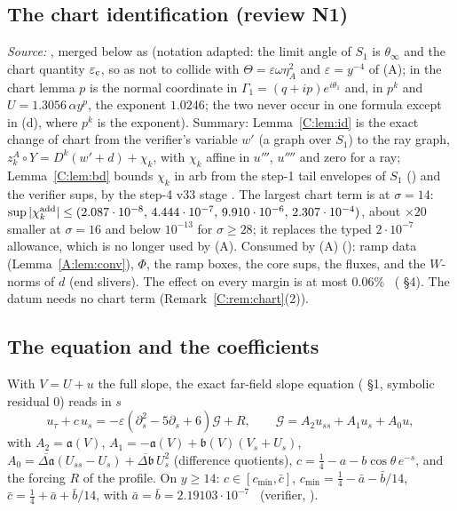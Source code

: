 \documentclass[11pt]{article}
\begin{document}
\subsection{The chart identification (review N1)}\label{A:sec:chart}
\noindent\emph{Source:} , merged below as  (notation adapted: the limit angle of $S_1$ is $\theta_\infty$ and the chart quantity $\varepsilon_{\rm c}$, so as not to collide with $\Theta=\varepsilon\omega\eta_A^2$ and $\varepsilon=y^{-4}$ of (A); in the chart lemma $p$ is the normal coordinate in $\Gamma_1=(q+ip)e^{i\theta_1}$ and, in $p^k$ and $U=1.3056\,\alpha y^p$, the exponent $1.0246$; the two never occur in one formula except in (d), where $p^k$ is the exponent). Summary: Lemma~\ref{C:lem:id} is the exact change of chart from the verifier's variable $w'$ (a graph over $S_1$) to the ray graph, $z^A_k\circ Y=D^k(w'+d)+\chi_k$, with $\chi_k$ affine in $u'''$, $u''''$ and zero for a ray; Lemma~\ref{C:lem:bd} bounds $\chi_k$ in arb from the step-1 tail envelopes of $S_1$ () and the verifier sups, by the step-4 v33 stage  \tC. The largest chart term is at $\sigma=14$: $\sup|\chi^{\rm add}_k|\le(2.087\cdot10^{-8},\,4.444\cdot10^{-7},\,9.910\cdot10^{-6},\,2.307\cdot10^{-4})$, about $\times20$ smaller at $\sigma=16$ and below $10^{-13}$ for $\sigma\ge28$; it replaces the typed $2\cdot10^{-7}$ allowance, which is no longer used by (A). Consumed by (A) (): ramp data (Lemma~\ref{A:lem:conv}), $\Phi$, the ramp boxes, the core sups, the fluxes, and the $W$-norms of $d$ (end slivers). The effect on every margin is at most $0.06\%$ \tC\ ( \S4). The datum needs no chart term (Remark~\ref{C:rem:chart}(2)).


\subsection{The equation and the coefficients}\label{A:sec:eq}
With $V=U+u$ the full slope, the exact far-field slope equation ( \S1, symbolic residual $0$) reads in $s$
\begin{equation}\label{A:eq:u}
u_\tau+c\,u_s=-\varepsilon(\partial_s^2-5\partial_s+6)\mathcal G+R,\qquad \mathcal G=A_2u_{ss}+A_1u_s+A_0u ,
\end{equation}
with $A_2=\mathfrak a(V)$, $A_1=-\mathfrak a(V)+\mathfrak b(V)(V_s+U_s)$, $A_0=\overline{\Delta\mathfrak a}(U_{ss}-U_s)+\overline{\Delta\mathfrak b}\,U_s^2$ (difference quotients), $c=\frac14-a-b\cos\theta\,e^{-s}$, and the forcing $R$ of the profile. On $y\ge14$: $c\in[c_{\min},\bar c]$, $c_{\min}=\frac14-\bar a-\bar b/14$, $\bar c=\frac14+\bar a+\bar b/14$, with $\bar a=\bar b=2.19103\cdot10^{-7}$ \tH\ (verifier, ).
\end{document}
